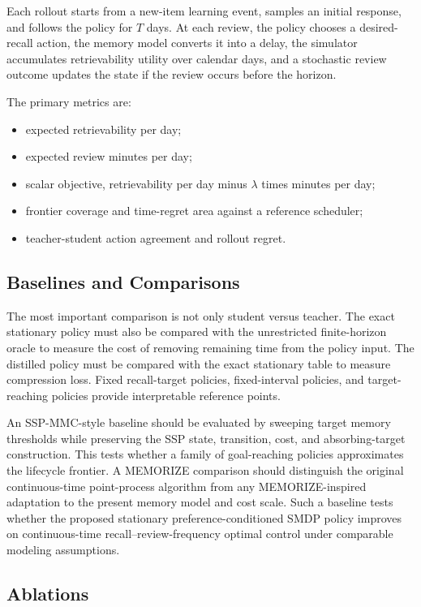 \documentclass[11pt]{article}
\begin{document}
Each rollout starts from a new-item learning event, samples an initial response, and follows the policy for \(T\) days. At each review, the policy chooses a desired-recall action, the memory model converts it into a delay, the simulator accumulates retrievability utility over calendar days, and a stochastic review outcome updates the state if the review occurs before the horizon.

The primary metrics are:
\begin{itemize}
    \item expected retrievability per day;
    \item expected review minutes per day;
    \item scalar objective, retrievability per day minus \(\lambda\) times minutes per day;
    \item frontier coverage and time-regret area against a reference scheduler;
    \item teacher-student action agreement and rollout regret.
\end{itemize}

\subsection{Baselines and Comparisons}

The most important comparison is not only student versus teacher. The exact stationary policy must also be compared with the unrestricted finite-horizon oracle to measure the cost of removing remaining time from the policy input. The distilled policy must be compared with the exact stationary table to measure compression loss. Fixed recall-target policies, fixed-interval policies, and target-reaching policies provide interpretable reference points.

An SSP-MMC-style baseline should be evaluated by sweeping target memory thresholds while preserving the SSP state, transition, cost, and absorbing-target construction. This tests whether a family of goal-reaching policies approximates the lifecycle frontier. A MEMORIZE comparison should distinguish the original continuous-time point-process algorithm from any MEMORIZE-inspired adaptation to the present memory model and cost scale. Such a baseline tests whether the proposed stationary preference-conditioned SMDP policy improves on continuous-time recall--review-frequency optimal control under comparable modeling assumptions.

\subsection{Ablations}
\end{document}
